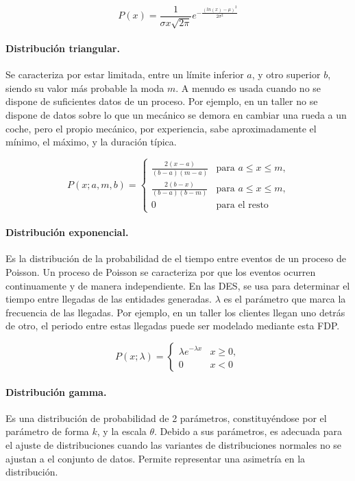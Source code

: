 \begin{equation}
	P(x) = \frac{1}{\sigma x \sqrt{2 \pi}} e^{-\frac{(ln(x)-\mu)^{2}}{2\sigma ^{2}}}
\end{equation}

\paragraph{Distribución triangular.} Se caracteriza por estar limitada,
entre un límite inferior $a$, y otro superior $b$,
siendo su valor más probable la moda $m$.
A menudo es usada cuando no se dispone de
suficientes datos de un proceso.
Por ejemplo, en un taller no se dispone de datos sobre
lo que un mecánico se demora en cambiar una rueda a un coche,
pero el propio mecánico, por experiencia,
sabe aproximadamente el mínimo, el máximo, y la duración típica. 

\begin{equation}
	P(x;a,m,b) =
	\begin{cases}
		\frac{2(x-a)}{(b-a)(m-a)}	&\text{para $a\leq x\leq m$,} \\
		\frac{2(b-x)}{(b-a)(b-m)}	&\text{para $a\leq x\leq m$,} \\
		0							&\text{para el resto}
	\end{cases}
\end{equation}

\paragraph{Distribución exponencial.} Es la distribución
de la probabilidad de el tiempo entre eventos de un proceso de Poisson.
Un proceso de Poisson se caracteriza por que los eventos
ocurren continuamente y de manera independiente.
En las DES, se usa para determinar el tiempo entre llegadas
de las entidades generadas.
$\lambda$ es el parámetro que marca la frecuencia de las llegadas.
Por ejemplo, en un taller los clientes llegan uno detrás de otro,
el periodo entre estas llegadas puede ser modelado mediante esta FDP.

\begin{equation}
	P(x; \lambda) =
	\begin{cases}
		\lambda e^{-\lambda x}	& x \geq 0, \\
		0										& x < 0
	\end{cases}
\end{equation}

\paragraph{Distribución gamma.} Es una distribución de probabilidad de
2 parámetros, constituyéndose por el parámetro de forma $k$,
y la escala $\theta$. Debido a sus parámetros,
es adecuada para el ajuste de distribuciones cuando las variantes
de distribuciones normales no se ajustan a el conjunto de datos.
Permite representar una asimetría en la distribución.

